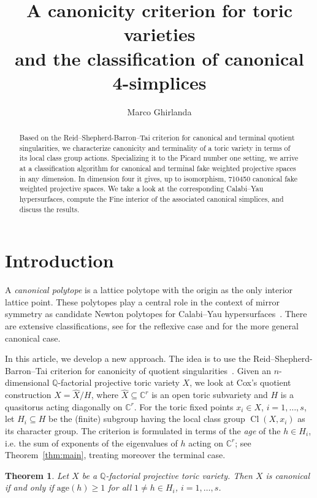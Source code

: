 \documentclass{amsart}
\title[A canonicity criterion for toric varieties]{A canonicity criterion for toric varieties \\ and the classification of canonical 4-simplices}
\author{Marco Ghirlanda}
\date{}
\newcommand{\C}{\mathbb{C}}
\newcommand{\Q}{\mathbb{Q}}
\DeclareMathOperator{\Cl}{Cl}
\theoremstyle{plain}
\newtheorem{theorem}{Theorem}[section]
\theoremstyle{definition}
\begin{document}
\begin{abstract}
Based on the Reid--Shepherd-Barron--Tai criterion for canonical and terminal quotient singularities, we characterize canonicity and terminality of a toric variety in terms of its local class group actions. Specializing it to the Picard number one setting, we arrive at a classification algorithm for canonical and terminal fake weighted projective spaces in any dimension.
In dimension four it gives, up to isomorphism, 710450 canonical fake weighted projective spaces.
We take a look at the corresponding Calabi--Yau hypersurfaces, compute the Fine interior of the associated canonical simplices, and discuss the results.
\end{abstract}

\maketitle

\section{Introduction}

A \emph{canonical polytope} is a lattice polytope with the origin as the only interior lattice point. These polytopes play a
central role in the context
of mirror symmetry as candidate Newton polytopes for Calabi--Yau hypersurfaces~\cites{Bat94,Bat17}.
There are extensive classifications, see \cites{Bat94,KS3,KS4,Ghi} for the reflexive case and \cites{Kas2,Kas3} for the more general canonical case.

In this article, we develop a new approach.
The idea is to use the Reid--Shepherd-Barron--Tai criterion for canonicity
of quotient singularities~\cite{MS84}.
Given an $n$-dimensional  $\Q$-factorial projective toric variety $X$,
we look at Cox's quotient construction $X = \hat X/H$, where
$\hat X \subseteq \C^r$ is an open toric
subvariety and $H$ is a quasitorus acting diagonally on $\C^r$.
For the toric fixed points $x_i \in X$, $i = 1, \ldots, s$, let $H_i \subseteq H$ be the (finite) subgroup having the local class group $\Cl(X,x_i)$ as its character group. 
The criterion is formulated in terms of the \emph{age}
of the $h\in H_i$, i.e. the sum of exponents of the eigenvalues of $h$ acting on $\C^r$; see Theorem~\ref{thm:main}, treating moreover the terminal case.

\begin{theorem}
Let $X$ be a $\Q$-factorial projective toric variety. Then $X$ is canonical
if and only if $\mathrm{age}(h) \ge 1$ for all $1 \neq h\in H_i$, $i=1,\dots,s$.
\end{theorem}
\end{document}
